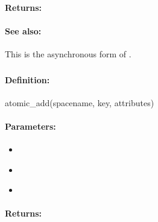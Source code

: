 \paragraph{Returns:}


\paragraph{See also:}  This is the asynchronous form of .

\pagebreak
\subsubsection{}
\label{api:ruby:atomic_add}


\paragraph{Definition:}
\begin{rubycode}
atomic_add(spacename, key, attributes)
\end{rubycode}

\paragraph{Parameters:}
\begin{itemize}[noitemsep]
\item {}\\

\item {}\\

\item {}\\

\end{itemize}

\paragraph{Returns:}


\pagebreak
\subsubsection{}
\label{api:ruby:async_atomic_add}


